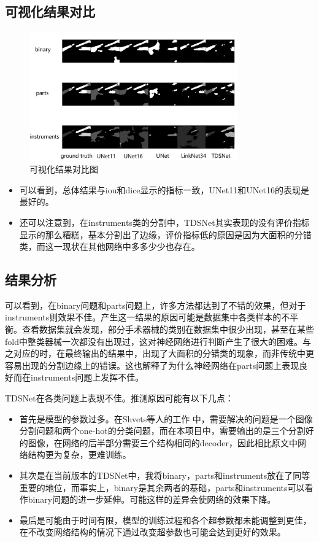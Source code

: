 \documentclass[UTF8]{ctexart}
\begin{document}
  
\subsection{可视化结果对比}

\begin{figure}[H]
    \centering  %
    \includegraphics[width=0.8\textwidth]{figure/visualize.png}
    \caption{可视化结果对比图}
\end{figure}

\begin{itemize}
    \item 可以看到，总体结果与iou和dice显示的指标一致，UNet11和UNet16的表现是最好的。
    \item 还可以注意到，在instruments类的分割中，TDSNet其实表现的没有评价指标显示的那么糟糕，基本分割出了边缘，评价指标低的原因是因为大面积的分错类，而这一现状在其他网络中多多少少也存在。
\end{itemize}

\subsection{结果分析}
可以看到，在binary问题和parts问题上，许多方法都达到了不错的效果，但对于instruments则效果不佳。产生这一结果的原因可能是数据集中各类样本的不平衡。查看数据集就会发现，部分手术器械的类别在数据集中很少出现，甚至在某些fold中整类器械一次都没有出现过，这对神经网络进行判断产生了很大的困难。与之对应的时，在最终输出的结果中，出现了大面积的分错类的现象，而非传统中更容易出现的分割边缘上的错误。这也解释了为什么神经网络在parts问题上表现良好而在instruments问题上发挥不佳。

TDSNet在各类问题上表现不佳。推测原因可能有以下几点：
\begin{itemize}
    \item 首先是模型的参数过多。在Shvets等人\cite{shvets2018automatic}的工作
    中，需要解决的问题是一个图像分割问题和两个one-hot的分类问题，而在本项目中，需要输出的是三个分割好的图像，在网络的后半部分需要三个结构相同的decoder，因此相比原文中网络结构更为复杂，更难训练。
    \item 其次是在当前版本的TDSNet中，我将binary，parts和instruments放在了同等重要的地位，而事实上，binary是其余两者的基础，parts和instruments可以看作binary问题的进一步延伸。可能这样的差异会使网络的效果下降。
    \item 最后是可能由于时间有限，模型的训练过程和各个超参数都未能调整到更佳，在不改变网络结构的情况下通过改变超参数也可能会达到更好的效果。
\end{itemize}
\end{document}

